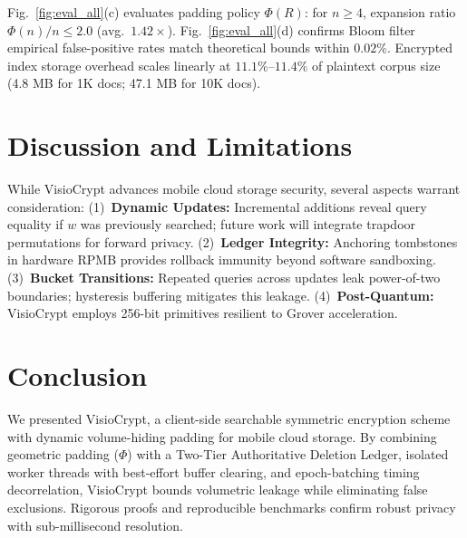 \documentclass[10pt,conference]{IEEEtran}
\begin{document}
Fig.~\ref{fig:eval_all}(c) evaluates padding policy $\Phi(R)$: for $n \ge 4$, expansion ratio $\Phi(n)/n \le 2.0$ (avg.\ $1.42\times$). Fig.~\ref{fig:eval_all}(d) confirms Bloom filter empirical false-positive rates match theoretical bounds within $0.02\%$. Encrypted index storage overhead scales linearly at $11.1\%$--$11.4\%$ of plaintext corpus size (4.8 MB for 1K docs; 47.1 MB for 10K docs).

\section{Discussion and Limitations}
\enlargethispage{3.0\baselineskip}
While VisioCrypt advances mobile cloud storage security, several aspects warrant consideration: (1)~\textbf{Dynamic Updates:} Incremental additions reveal query equality if $w$ was previously searched; future work will integrate trapdoor permutations \cite{bost2016sophos} for forward privacy. (2)~\textbf{Ledger Integrity:} Anchoring tombstones in hardware RPMB \cite{pinto2019} provides rollback immunity beyond software sandboxing. (3)~\textbf{Bucket Transitions:} Repeated queries across updates leak power-of-two boundaries; hysteresis buffering mitigates this leakage. (4)~\textbf{Post-Quantum:} VisioCrypt employs 256-bit primitives resilient to Grover acceleration.

\section{Conclusion}

We presented VisioCrypt, a client-side searchable symmetric encryption scheme with dynamic volume-hiding padding for mobile cloud storage. By combining geometric padding ($\Phi$) with a Two-Tier Authoritative Deletion Ledger, isolated worker threads with best-effort buffer clearing, and epoch-batching timing decorrelation, VisioCrypt bounds volumetric leakage while eliminating false exclusions. Rigorous proofs and reproducible benchmarks confirm robust privacy with sub-millisecond resolution.


\let\oldbibliography\thebibliography
\renewcommand{\thebibliography}[1]{%
  \oldbibliography{#1}%
  \fontsize{4.85pt}{5.5pt}\selectfont
  \setlength{\itemsep}{0pt}%
  \setlength{\parsep}{0pt}%
}

\end{document}
